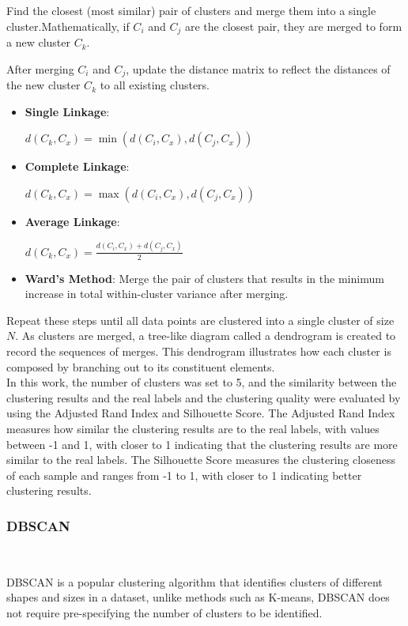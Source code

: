 \documentclass[conference]{IEEEtran}
\begin{document}
	Find the closest (most similar) pair of clusters and merge them into a single cluster.Mathematically, if $C_i$ and $C_j$ are the closest pair, they are merged to form a new cluster $C_k$.
	
	After merging $C_i$ and $C_j$, update the distance matrix to reflect the distances of the new cluster $C_k$ to all existing clusters. 
	\begin{itemize}
		\item \textbf{Single Linkage}:
		
		$d(C_k, C_x) = \min(d(C_i, C_x), d(C_j, C_x))$
		\item \textbf{Complete Linkage}: 
		
		$d(C_k, C_x) = \max(d(C_i, C_x), d(C_j, C_x))$
		\item \textbf{Average Linkage}: 
		
		$d(C_k, C_x) = \frac{d(C_i, C_x) + d(C_j, C_x)}{2}$
		\item \textbf{Ward's Method}: Merge the pair of clusters that results in the minimum increase in total within-cluster variance after merging.
	\end{itemize}
	
	Repeat these steps until all data points are clustered into a single cluster of size $N$. As clusters are merged, a tree-like diagram called a dendrogram is created to record the sequences of merges. This dendrogram illustrates how each cluster is composed by branching out to its constituent elements.
    \\
	
	In this work, the number of clusters was set to 5, and the similarity between the clustering results and the real labels and the clustering quality were evaluated by using the Adjusted Rand Index and Silhouette Score. The Adjusted Rand Index measures how similar the clustering results are to the real labels, with values between -1 and 1, with closer to 1 indicating that the clustering results are more similar to the real labels. The Silhouette Score measures the clustering closeness of each sample and ranges from -1 to 1, with closer to 1 indicating better clustering results.
	\\
 
	\subsubsection{DBSCAN} \
	
	DBSCAN is a popular clustering algorithm that identifies clusters of different shapes and sizes in a dataset, unlike methods such as K-means, DBSCAN does not require pre-specifying the number of clusters to be identified.
	
\end{document}
